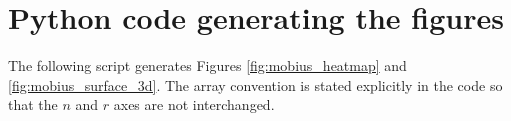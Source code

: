 \documentclass[11pt]{amsart}
\numberwithin{equation}{section}
\theoremstyle{plain}
\theoremstyle{definition}
\theoremstyle{remark}
\begin{document}
\appendix

\section{Python code generating the figures}
\label{app:python}

The following script generates Figures \ref{fig:mobius_heatmap} and \ref{fig:mobius_surface_3d}.  The array convention is stated explicitly in the code so that the $n$ and $r$ axes are not interchanged.


\end{document}
